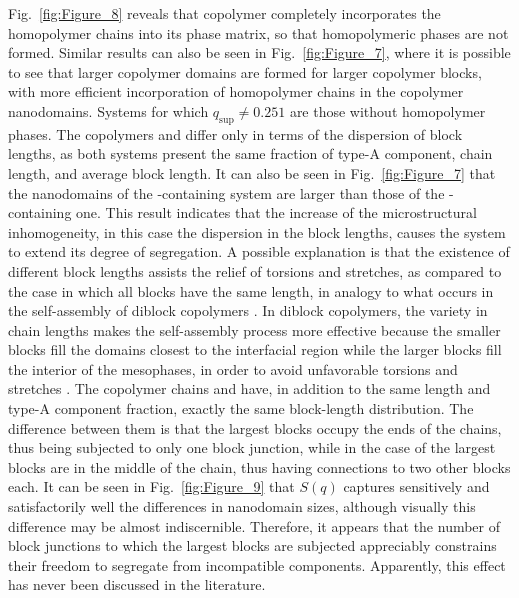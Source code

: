\documentclass[
aip,
jcp,
reprint,
]{revtex4-1}
\begin{document}
Fig.~\ref{fig:Figure_8} reveals that copolymer  completely incorporates the homopolymer chains into its phase matrix, so that homopolymeric phases are not formed.
Similar results can also be seen in Fig.~\ref{fig:Figure_7}, where it is possible to see that larger copolymer domains are formed for larger copolymer blocks, with more efficient incorporation of homopolymer chains in the copolymer nanodomains.
Systems for which $q_\mathrm{sup} \neq 0.251$ are those without homopolymer phases.
The copolymers  and  differ only in terms of the dispersion of block lengths, as both systems present the same fraction of type-A component, chain length, and average block length.
It can also be seen in Fig.~\ref{fig:Figure_7} that the nanodomains of the -containing system are larger than those of the -containing one.
This result indicates that the increase of the microstructural inhomogeneity, in this case the dispersion in the block lengths, causes the system to extend its degree of segregation.
A possible explanation is that the existence of different block lengths assists the relief of torsions and stretches, as compared to the case in which all blocks have the same length, in analogy to what occurs in the self-assembly of diblock copolymers \cite{Matsen_2006, Lemos_2020}.
In diblock copolymers, the variety in chain lengths makes the self-assembly process more effective because the smaller blocks fill the domains closest to the interfacial region while the larger blocks fill the interior of the mesophases, in order to avoid unfavorable torsions and stretches \cite{Matsen_2006, Lemos_2020}.
The copolymer chains  and  have, in addition to the same length and type-A component fraction, exactly the same block-length distribution.
The difference between them is that the largest blocks occupy the ends of the  chains, thus being subjected to only one block junction, while in the case of  the largest blocks are in the middle of the chain, thus having connections to two other blocks each.
It can be seen in Fig.~\ref{fig:Figure_9} that $S(q)$ captures sensitively and satisfactorily well the differences in nanodomain sizes, although visually this difference may be almost indiscernible.
Therefore, it appears that the number of block junctions to which the largest blocks are subjected appreciably constrains their freedom to segregate from incompatible components. Apparently, this effect has never been discussed in the literature.
\end{document}
